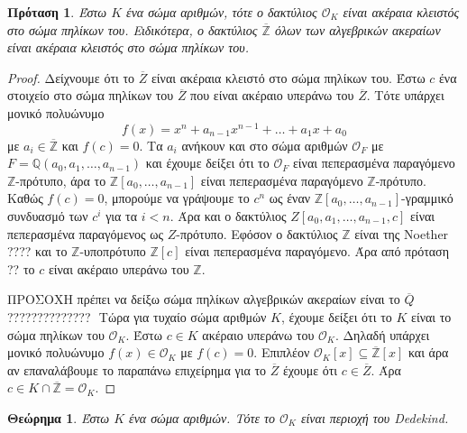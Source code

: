 \documentclass[oneside,a4paper]{article}
\newtheorem{theorem}{Θεώρημα}
\newtheorem{prop}{Πρόταση}
\newcommand {\tl}{\textlatin}
\newcommand{\Z}{\mathbb{Z}}
\newcommand{\Q}{\mathbb{Q}}
\begin{document}
\begin{prop}
	Έστω $K$ ένα σώμα αριθμών, τότε ο δακτύλιος $\mathcal{O}_K$ είναι ακέραια κλειστός στο σώμα πηλίκων του. Ειδικότερα, ο δακτύλιος $\overline{\Z}$ όλων των αλγεβρικών ακεραίων είναι ακέραια κλειστός στο σώμα πηλίκων του.
\end{prop}
\begin{proof}
	Δείχνουμε ότι το $\overline{Z}$ είναι ακέραια κλειστό στο σώμα πηλίκων του. Έστω $c$ ένα στοιχείο στο σώμα πηλίκων του $\overline{Z}$ που είναι ακέραιο υπεράνω του $\overline{Z}$. Τότε υπάρχει μονικό πολυώνυμο $$f(x) = x^n + a_{n-1}x^{n-1} + \ldots + a_1 x + a_0$$ με $a_i \in \overline{\Z}$ και $f(c) = 0$. Τα $a_i$ ανήκουν και στο σώμα αριθμών $\mathcal{O}_F$ με $F=\Q(a_0,a_1,\ldots,a_{n-1})$ και έχουμε δείξει ότι το $\mathcal{O}_F$ είναι πεπερασμένα παραγόμενο $\Z$-πρότυπο, άρα το $\Z[a_0,\ldots,a_{n-1}]$ είναι πεπερασμένα παραγόμενο $\Z$-πρότυπο. Καθώς $f(c) = 0$, μπορούμε να γράψουμε το $c^n$ ως έναν $\Z[a_0,\ldots,a_{n-1}]$-γραμμικό συνδυασμό των $c^i$ για τα $i<n$. Άρα και ο δακτύλιος $Z[a_0,a_1,\ldots,a_{n-1},c]$ είναι πεπερασμένα παραγόμενος ως $Z$-πρότυπο. Εφόσον ο δακτύλιος $\Z$ είναι της \tl{Noether} ???? και το $\Z$-υποπρότυπο $\Z [c]$ είναι πεπερασμένα παραγόμενο. Άρα από πρόταση ?? το $c$ είναι ακέραιο υπεράνω του $\Z$.


	ΠΡΟΣΟΧΗ πρέπει να δείξω σώμα πηλίκων αλγεβρικών ακεραίων είναι το $\overline{Q}$??????????????
	$ $\newline
	Τώρα για τυχαίο σώμα αριθμών $K$, έχουμε δείξει ότι το $K$ είναι το σώμα πηλίκων του $\mathcal{O}_K$. Έστω $c \in K$ ακέραιο υπεράνω του $\mathcal{O}_K$. Δηλαδή υπάρχει μονικό πολυώνυμο $f(x) \in \mathcal{O}_K$ με $f(c)=0$. Επιπλέον $\mathcal{O}_K [x] \subseteq \overline{\Z}[x]$ και άρα αν επαναλάβουμε το παραπάνω επιχείρημα για το $\overline{Z}$ έχουμε ότι $c \in \overline{Z}$. Άρα $c \in K\cap \overline{\Z} = \mathcal{O}_K$.
\end{proof}

\begin{theorem} Έστω $K$ ένα σώμα αριθμών. Τότε το $\mathcal{O}_K$ είναι περιοχή του \tl{Dedekind}.
\end{theorem}
\end{document}
